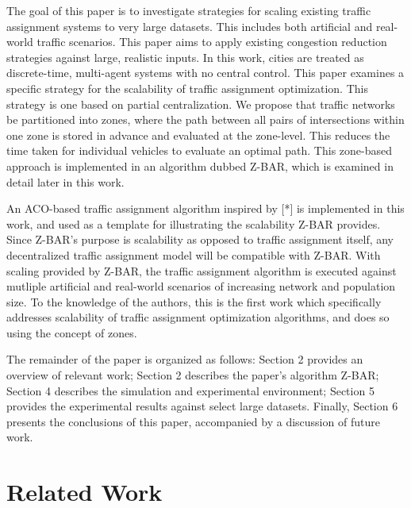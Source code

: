 \documentclass[conference]{IEEEtran}
\begin{document}
The goal of this paper is to investigate strategies for scaling existing traffic assignment systems to very large datasets. This includes both artificial and real-world traffic scenarios. This paper aims to apply existing congestion reduction strategies against large, realistic inputs. In this work, cities are treated as discrete-time, multi-agent systems with no central control. This paper examines a specific strategy for the scalability of traffic assignment optimization. This strategy is one based on partial centralization. We propose that traffic networks be partitioned into zones, where the path between all pairs of intersections within one zone is stored in advance and evaluated at the zone-level. This reduces the time taken for individual vehicles to evaluate an optimal path. This zone-based approach is implemented in an algorithm dubbed Z-BAR, which is examined in detail later in this work.

An ACO-based traffic assignment algorithm inspired by [*] is implemented in this work, and used as a template for illustrating the scalability Z-BAR provides. Since Z-BAR's purpose is scalability as opposed to traffic assignment itself, any decentralized traffic assignment model will be compatible with Z-BAR. With scaling provided by Z-BAR, the traffic assignment algorithm is executed against mutliple artificial and real-world scenarios of increasing network and population size. To the knowledge of the authors, this is the first work which specifically addresses scalability of traffic assignment optimization algorithms, and does so using the concept of zones.

The remainder of the paper is organized as follows: Section 2 provides an overview of relevant work; Section 2 describes the paper's algorithm Z-BAR; Section 4 describes the simulation and experimental environment; Section 5 provides the experimental results against select large datasets. Finally, Section 6 presents the conclusions of this paper, accompanied by a discussion of future work.


\section{Related Work} %
\end{document}
